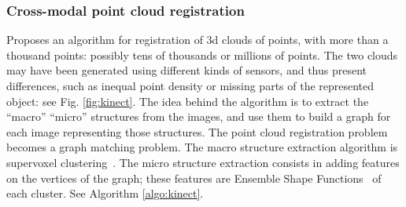 \documentclass[11pt]{article} %
\begin{document}


    \subsubsection{Cross-modal point cloud registration \cite{huang:kinect}}
Proposes an algorithm for registration of 3d clouds of points, with more than a thousand points: possibly tens of thousands or millions of points. The two clouds may have been generated using different kinds of sensors, and thus present differences, such as inequal point density or missing parts of the represented object: see Fig. \ref{fig:kinect}. The idea behind the algorithm is to extract the ``macro'' ``micro'' structures from the images, and use them to build a graph for each image representing those structures. The point cloud registration problem becomes a graph matching problem. The macro structure extraction algorithm is supervoxel clustering~\cite{papon:supervoxels}. The micro structure extraction consists in adding features on the vertices of the graph; these features are Ensemble Shape Functions~\cite{wohlkinger:esf} of each cluster.
See Algorithm \ref{algo:kinect}.
\end{document}
